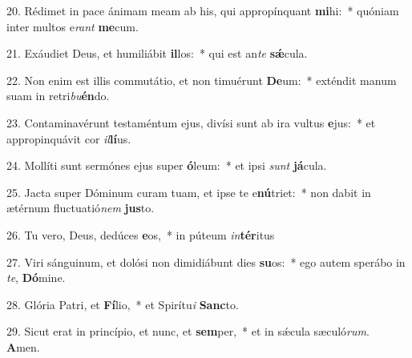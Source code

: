 20. Rédimet in pace ánimam meam ab his, qui appropínquant \textbf{mi}hi:~*  quóniam inter multos e\textit{rant} \textbf{me}cum.\

21. Exáudiet Deus, et humiliábit \textbf{il}los:~*  qui est an\textit{te} \textbf{sǽ}cula.\

22. Non enim est illis commutátio, et non timuérunt \textbf{De}um:~*  exténdit manum suam in retri\textit{bu}\textbf{én}do.\

23. Contaminavérunt testaméntum ejus, divísi sunt ab ira vultus \textbf{e}jus:~*  et appropinquávit cor \textit{il}\textbf{lí}us.\

24. Mollíti sunt sermónes ejus super \textbf{ó}leum:~*  et ipsi \textit{sunt} \textbf{já}cula.\

25. Jacta super Dóminum curam tuam, et ipse te e\textbf{nú}triet:~*  non dabit in ætérnum fluctuatió\textit{nem} \textbf{jus}to.\

26. Tu vero, Deus, dedúces \textbf{e}os,~*  in púteum \textit{in}\textbf{tér}itus\

27. Viri sánguinum, et dolósi non dimidiábunt dies \textbf{su}os:~*  ego autem sperábo in \textit{te}, \textbf{Dó}mine.\

28. Glória Patri, et \textbf{Fí}lio,~*  et Spirítu\textit{i} \textbf{Sanc}to.\

29. Sicut erat in princípio, et nunc, et \textbf{sem}per,~*  et in sǽcula sæculó\textit{rum}. \textbf{A}men.\

